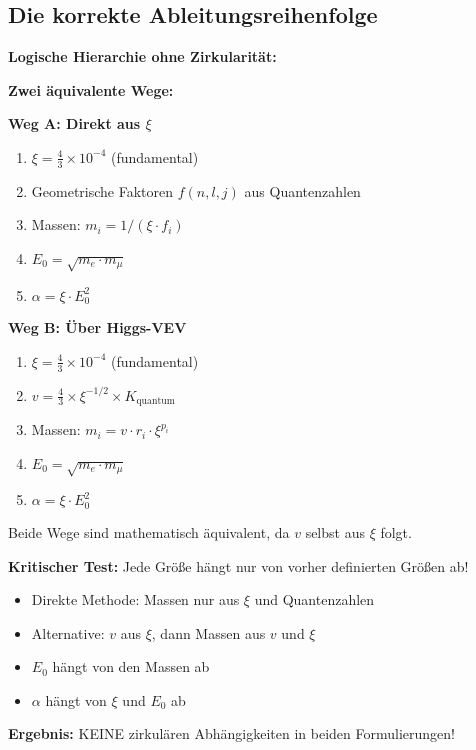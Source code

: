 \documentclass[12pt,a4paper]{article}
\newcommand{\xipar}{\xi}
\newcommand{\Ezero}{E_0}
\newcommand{\Kquantum}{K_{\text{quantum}}}
\begin{document}
	\subsection{Die korrekte Ableitungsreihenfolge}
	
	\begin{result}
		\textbf{Logische Hierarchie ohne Zirkularität:}
		
		\textbf{Zwei äquivalente Wege:}
		
		\textbf{Weg A: Direkt aus $\xi$}
		\begin{enumerate}
			\item $\xipar = \frac{4}{3} \times 10^{-4}$ (fundamental)
			\item Geometrische Faktoren $f(n,l,j)$ aus Quantenzahlen
			\item Massen: $m_i = 1/(\xi \cdot f_i)$
			\item $\Ezero = \sqrt{m_e \cdot m_\mu}$
			\item $\alpha = \xipar \cdot \Ezero^2$
		\end{enumerate}
		
		\textbf{Weg B: Über Higgs-VEV}
		\begin{enumerate}
			\item $\xipar = \frac{4}{3} \times 10^{-4}$ (fundamental)
			\item $v = \frac{4}{3} \times \xipar^{-1/2} \times \Kquantum$
			\item Massen: $m_i = v \cdot r_i \cdot \xipar^{p_i}$
			\item $\Ezero = \sqrt{m_e \cdot m_\mu}$
			\item $\alpha = \xipar \cdot \Ezero^2$
		\end{enumerate}
		
		Beide Wege sind mathematisch äquivalent, da $v$ selbst aus $\xi$ folgt.
		
		\textbf{Kritischer Test:} Jede Größe hängt nur von vorher definierten Größen ab!
		\begin{itemize}
			\item Direkte Methode: Massen nur aus $\xipar$ und Quantenzahlen \checkmark
			\item Alternative: $v$ aus $\xipar$, dann Massen aus $v$ und $\xipar$ \checkmark
			\item $\Ezero$ hängt von den Massen ab \checkmark
			\item $\alpha$ hängt von $\xipar$ und $\Ezero$ ab \checkmark
		\end{itemize}
		
		\textbf{Ergebnis:} KEINE zirkulären Abhängigkeiten in beiden Formulierungen!
	\end{result}
	
\end{document}
